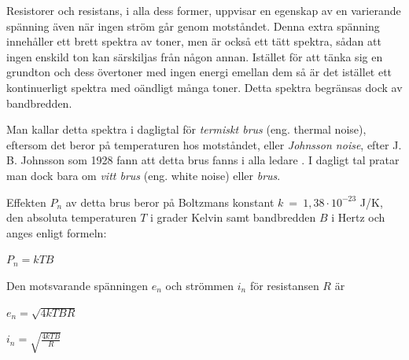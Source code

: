 \begin{rev-nytt}[MAD]
Resistorer och resistans, i alla dess former, uppvisar en egenskap av
en varierande spänning även när ingen ström går genom motståndet. Denna extra
spänning innehåller ett brett spektra av toner, men är också ett tätt spektra,
sådan att ingen enskild ton kan särskiljas från någon annan. Istället för att
tänka sig en grundton och dess övertoner med ingen energi emellan dem så är det
istället ett kontinuerligt spektra med oändligt många toner. Detta spektra
begränsas dock av bandbredden.




Man kallar detta spektra i dagligtal för \emph{termiskt brus}
(eng. thermal noise), eftersom det beror på temperaturen hos motståndet, eller
\emph{Johnsson noise}, efter J. B. Johnsson som 1928 fann att detta brus fanns
i alla ledare \cite{ott1988}.
I dagligt tal pratar man dock bara om \emph{vitt brus} (eng. white noise) eller
\emph{brus}.

Effekten \(P_n\) av detta brus beror på Boltzmans konstant
\(k\ =\ 1,38 \cdot 10^{-23}\) J/K, den absoluta temperaturen \(T\) i
grader Kelvin samt bandbredden \(B\) i Hertz och anges enligt formeln:

\(P_n = k T B\)

Den motsvarande spänningen \(e_n\) och strömmen \(i_n\) för resistansen \(R\) är

\(e_n = \sqrt{4kTBR}\)

\(i_n = \sqrt{\frac{4kTB}{R}}\)

\end{rev-nytt}

